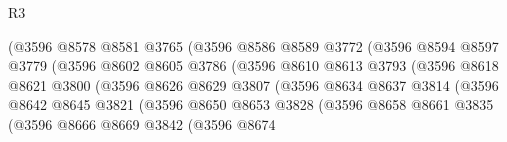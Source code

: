 \begin{lexlean}{R3}
\begin{coremodule}
                                  (@3596
                                    @8578
                                    @8581
                                    @3765
                                    (@3596
                                      @8586
                                      @8589
                                      @3772
                                      (@3596
                                        @8594
                                        @8597
                                        @3779
                                        (@3596
                                          @8602
                                          @8605
                                          @3786
                                          (@3596
                                            @8610
                                            @8613
                                            @3793
                                            (@3596
                                              @8618
                                              @8621
                                              @3800
                                              (@3596
                                                @8626
                                                @8629
                                                @3807
                                                (@3596
                                                  @8634
                                                  @8637
                                                  @3814
                                                  (@3596
                                                    @8642
                                                    @8645
                                                    @3821
                                                    (@3596
                                                      @8650
                                                      @8653
                                                      @3828
                                                      (@3596
                                                        @8658
                                                        @8661
                                                        @3835
                                                        (@3596
                                                          @8666
                                                          @8669
                                                          @3842
                                                          (@3596
                                                            @8674

\end{coremodule}
\end{lexlean}
